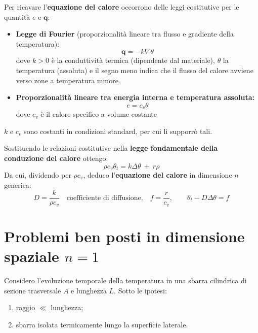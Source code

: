 \documentclass[10pt,a4paper,twoside,openright]{book}
\begin{document}
Per ricavare l'\textbf{equazione del calore} occorrono delle leggi costitutive per le quantità $e$ e $\displaystyle \mathbf{q}$:
\begin{itemize}
    \item \textbf{Legge di Fourier} (proporzionalità lineare tra flusso e gradiente della temperatura):
          \begin{equation*}
              \mathbf{q} =-k\nabla \theta
          \end{equation*}dove $k >0$ è la conduttività termica (dipendente dal materiale), $\displaystyle \theta $ la temperatura (assoluta) e il segno meno indica che il flusso del calore avviene verso zone a temperatura minore.
    \item \textbf{Proporzionalità lineare tra energia interna e temperatura assoluta:}
          \begin{equation*}
              e=c_{v} \theta
          \end{equation*}
          dove $\displaystyle c_{v}$ è il calore specifico a volume costante
\end{itemize}
$k$ e $\displaystyle c_{v}$ sono costanti in condizioni standard, per cui li supporrò tali.

Sostituendo le relazioni costitutive nella \textbf{legge fondamentale della conduzione del calore} ottengo:
\begin{equation*}
    \boxed{\rho c_{v} \theta _{t} =k\Delta \theta \ +\ r\rho }
\end{equation*}
Da cui, dividendo per $\displaystyle \rho c_{v}$, deduco l'\textbf{equazione del calore} in dimensione $n$ generica:
\begin{equation*}
    D=\frac{k}{\rho c_{v}} \quad \text{coefficiente di diffusione,} \quad f=\frac{r}{c_{v}}, \qquad \boxed{\theta _{t} -D\Delta \theta =f}
\end{equation*}

\section{Problemi ben posti in dimensione spaziale \texorpdfstring{$n=1$}{n=1}}

Considero l'evoluzione temporale della temperatura in una sbarra cilindrica di sezione trasversale $A$ e lunghezza $L$. Sotto le ipotesi:
\begin{enumerate}
    \item  raggio $\ll$ lunghezza;
    \item  sbarra isolata termicamente lungo la superficie laterale.
\end{enumerate}
\end{document}
